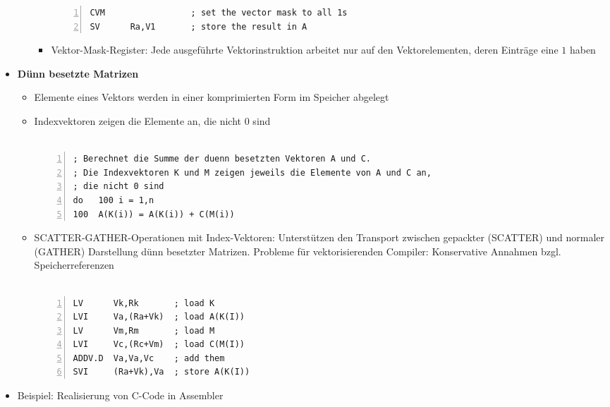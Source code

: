 \begin{itemize}
\begin{itemize}
\begin{itemize}
\begin{minipage}{\linewidth}
\begin{lstlisting}[frame=single,numbers=left,mathescape,language={[mips]Assembler},tabsize=4]
CVM              	; set the vector mask to all 1s
SV 		Ra,V1       ; store the result in A
				\end{lstlisting}
				\end{minipage}
			\item Vektor-Mask-Register: Jede ausgeführte Vektorinstruktion arbeitet nur auf den Vektorelementen, deren Einträge eine \(1\) haben
		\end{itemize}
	\end{itemize}
	\item \textbf{Dünn besetzte Matrizen}
	\begin{itemize}
		\item Elemente eines Vektors werden in einer komprimierten Form im Speicher abgelegt
		\item Indexvektoren zeigen die Elemente an, die nicht \(0\) sind\\\\
			\begin{minipage}{\linewidth}
			\begin{lstlisting}[frame=single,numbers=left,mathescape,language={[mips]Assembler},tabsize=4]
; Berechnet die Summe der duenn besetzten Vektoren A und C.
; Die Indexvektoren K und M zeigen jeweils die Elemente von A und C an,
; die nicht 0 sind
do 	 100 i = 1,n
100  A(K(i)) = A(K(i)) + C(M(i))
			\end{lstlisting}
			\end{minipage}
		\item SCATTER-GATHER-Operationen mit Index-Vektoren: Unterstützen den Transport zwischen gepackter (SCATTER) und normaler (GATHER) Darstellung dünn besetzter Matrizen. Probleme für vektorisierenden Compiler: Konservative Annahmen bzgl. Speicherreferenzen\\\\
			\begin{minipage}{\linewidth}
			\begin{lstlisting}[frame=single,numbers=left,mathescape,language={[mips]Assembler},tabsize=4]
LV 		Vk,Rk 		; load K
LVI 	Va,(Ra+Vk) 	; load A(K(I))
LV 		Vm,Rm 		; load M
LVI 	Vc,(Rc+Vm) 	; load C(M(I))
ADDV.D 	Va,Va,Vc 	; add them
SVI 	(Ra+Vk),Va 	; store A(K(I))
			\end{lstlisting}
			\end{minipage}		
	\end{itemize}
	\item Beispiel: Realisierung von C-Code in Assembler\\\\
		\begin{minipage}{\linewidth}

\end{minipage}
\end{itemize}
